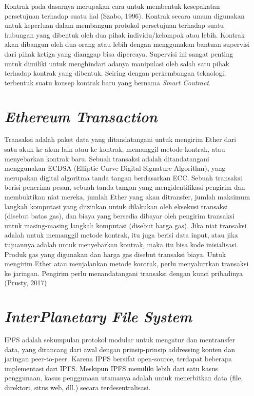 Kontrak pada dasarnya merupakan cara untuk membentuk kesepakatan persetujuan terhadap suatu hal (Szabo, 1996).
Kontrak secara umum digunakan untuk keperluan dalam membangun protokol persetujuan terhadap suatu hubungan yang dibentuk
oleh dua pihak individu/kelompok atau lebih. Kontrak akan dibangun oleh dua orang atau lebih dengan menggunakan bantuan
supervisi dari pihak ketiga yang dianggap bisa dipercaya. Supervisi ini sangat penting untuk dimiliki untuk menghindari adanya
manipulasi oleh salah satu pihak terhadap kontrak yang dibentuk. Seiring dengan perkembangan teknologi, terbentuk suatu konsep
kontrak baru yang bernama \emph{Smart Contract}.

\section{\emph{Ethereum Transaction}}

Transaksi adalah paket data yang ditandatangani untuk mengirim Ether dari satu akun ke akun lain atau ke kontrak, memanggil
metode kontrak, atau menyebarkan kontrak baru. Sebuah transaksi adalah ditandatangani menggunakan ECDSA (Elliptic Curve Digital
Signature Algorithm), yang merupakan digital algoritma tanda tangan berdasarkan ECC. Sebuah transaksi berisi penerima pesan,
sebuah tanda tangan yang mengidentifikasi pengirim dan membuktikan niat mereka, jumlah Ether yang akan ditransfer, jumlah
maksimum langkah komputasi yang diizinkan untuk dilakukan oleh eksekusi transaksi (disebut batas gas), dan biaya yang
bersedia dibayar oleh pengirim transaksi untuk masing-masing langkah komputasi (disebut harga gas). Jika niat transaksi
adalah untuk memanggil metode kontrak, itu juga berisi data input, atau jika tujuannya adalah untuk menyebarkan kontrak,
maka itu bisa kode inisialisasi. Produk gas yang digunakan dan harga gas disebut transaksi biaya. Untuk mengirim Ether atau
menjalankan metode kontrak, perlu menyalurrkan transaksi ke jaringan. Pengirim perlu menandatangani transaksi dengan kunci
pribadinya (Prusty, 2017)

\section{\emph{InterPlanetary File System}}

IPFS adalah sekumpulan protokol modular untuk mengatur dan mentransfer data, yang dirancang dari awal dengan prinsip-prinsip
addressing konten dan jaringan peer-to-peer. Karena IPFS bersifat open-source, terdapat beberapa implementasi dari IPFS.
Meskipun IPFS memiliki lebih dari satu kasus penggunaan, kasus penggunaan utamanya adalah untuk menerbitkan data
(file, direktori, situs web, dll.) secara terdesentralisasi.

